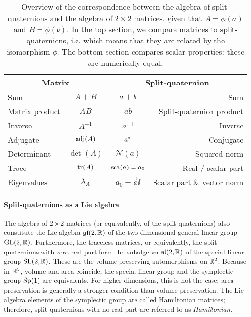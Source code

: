 \renewcommand{\arraystretch}{1.3}
\begin{table}
    \centering
    \caption{Overview of the correspondence between the algebra of split-quaternions and the algebra of \(2\times2\) matrices, given that \(A = \phi(a)\) and \(B = \phi(b)\). In the top section, we compare matrices to split-quaternions, i.e. which means that they are related by the isomorphism \(\phi\). The bottom section compares scalar properties: these are numerically equal.}
    \label{tab:spquat_matrices}
    \begin{tabular}{lc|cr}
    \toprule
        \multicolumn{2}{c}{\textbf{Matrix}} & \multicolumn{2}{c}{\textbf{Split-quaternion}} \\
    \midrule
        Sum      & \( A + B \)      & \( a + b\) & Sum \\
        Matrix product  & \( AB \)  & \( ab\) & Split-quaternion product \\
        Inverse  & \(A^{-1}\)       & \(a^{-1}\) & Inverse \\
        Adjugate & \(\operatorname{adj}(A)\) & \(a^*\) & Conjugate \\
        \midrule
        Determinant & \(\det(A)\) & \(\mathscr{N}(a)\) & Squared norm \\
        Trace       & \(\trace(A)\) & \(\mathrm{sca}\qty(a) = a_0\) & Real / scalar part \\
        Eigenvalues \hspace{1.5cm} & \(\lambda_{A} \) & \( a_0 + \vec{a}\ii \) & Scalar part \& vector norm \\
    \bottomrule
    \end{tabular}
\end{table}
\renewcommand{\arraystretch}{1}

\paragraph{Split-quaternions as a Lie algebra} 
The algebra of \(2\times2\)-matrices (or equivalently, of the split-quaternions) also constitute the Lie algebra \(\mathfrak{gl}(2, \mathbb{R})\) of the two-dimensional general linear group \(\mathrm{GL}(2, \mathbb{R})\). Furthermore, the traceless matrices, or equivalently, the split-quaternions with zero real part form the subalgebra \(\mathfrak{sl}(2, \mathbb{R})\) of the special linear group \(\mathrm{SL}(2, \mathbb{R})\). These are the volume-preserving automorphisms on \(\mathbb{R}^2\). Because in \(\mathbb{R}^2\), volume and area coincide, the special linear group and the symplectic group \(\mathrm{Sp}(1)\) are equivalents. For higher dimensions, this is not the case: area preservation is generally a stronger condition than volume preservation. The Lie algebra elements of the symplectic group are called Hamiltonian matrices; therefore, split-quaternions with no real part are referred to as \emph{Hamiltonian}.

